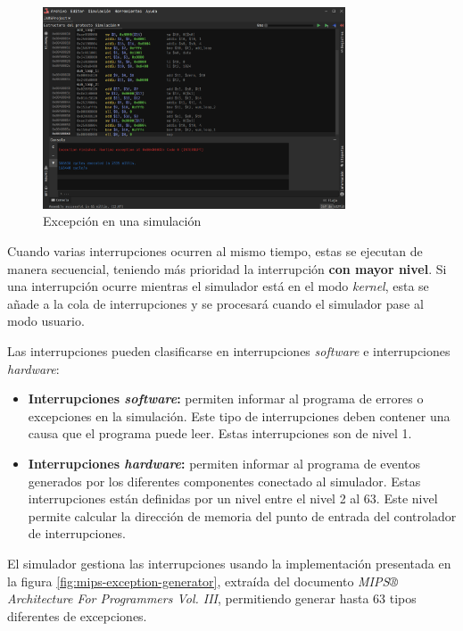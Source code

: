\begin{figure}[h]
    \centering
    \includegraphics[width=0.8\textwidth]{images/mips/jams-exception}
    \caption{Excepción en una simulación}
    \label{fig:jams-exception}
\end{figure}

Cuando varias interrupciones ocurren al mismo tiempo,
estas se ejecutan de manera secuencial, teniendo más prioridad
la interrupción \textbf{con mayor nivel}.
Si una interrupción ocurre mientras el simulador está en el
modo \textit{kernel}, esta se añade a la cola de interrupciones
y se procesará cuando el simulador pase al modo usuario.

Las interrupciones pueden clasificarse en interrupciones
\textit{software} e interrupciones \textit{hardware}:
\begin{itemize}
    \item \textbf{Interrupciones \textit{software}:} permiten informar
    al programa de errores o excepciones en la simulación.
    Este tipo de interrupciones deben contener una causa que
    el programa puede leer.
    Estas interrupciones son de nivel 1.
    \item \textbf{Interrupciones \textit{hardware}:} permiten informar
    al programa de eventos generados por los diferentes componentes
    conectado al simulador.
    Estas interrupciones están definidas por un nivel entre el
    nivel 2 al 63.
    Este nivel permite calcular la dirección de memoria
    del punto de entrada del controlador de interrupciones.
\end{itemize}

El simulador gestiona las interrupciones usando la
implementación presentada en la figura \ref{fig:mips-exception-generator},
extraída del documento
\textit{MIPS® Architecture For Programmers Vol. III}\cite{MIPS_VOL_3},
permitiendo generar hasta 63 tipos diferentes de excepciones.

